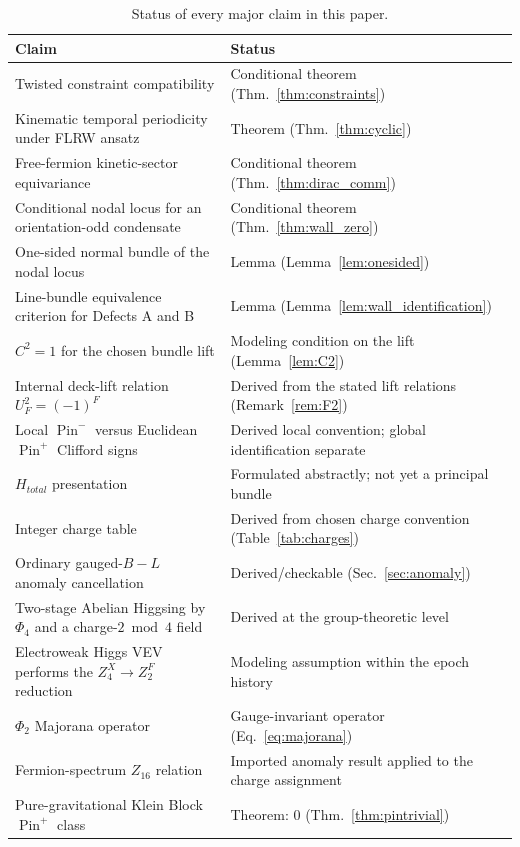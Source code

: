 \documentclass[11pt]{article}
\theoremstyle{canonmath}
\theoremstyle{canonpostulate}
\theoremstyle{canonclaim}
\providecommand{\Pin}{\operatorname{Pin}}
\def\mathrm#1{#1}%
\def\mathbb#1{#1}%
\begin{document}
\begin{table}[H]
\centering
\caption{Status of every major claim in this paper.}
\small
\begin{tabular}{@{}p{}p{}@{}}
\toprule
\textbf{Claim} & \textbf{Status} \\
\midrule
Twisted constraint compatibility & Conditional theorem (Thm.~\ref{thm:constraints}) \\
Kinematic temporal periodicity under FLRW ansatz & Theorem (Thm.~\ref{thm:cyclic}) \\
Free-fermion kinetic-sector equivariance & Conditional theorem (Thm.~\ref{thm:dirac_comm}) \\
Conditional nodal locus for an orientation-odd condensate & Conditional theorem (Thm.~\ref{thm:wall_zero}) \\
One-sided normal bundle of the nodal locus & Lemma (Lemma~\ref{lem:onesided}) \\
Line-bundle equivalence criterion for Defects A and B & Lemma (Lemma~\ref{lem:wall_identification}) \\
$C^2=1$ for the chosen bundle lift & Modeling condition on the lift (Lemma~\ref{lem:C2}) \\
Internal deck-lift relation $U_F^2=(-1)^F$ & Derived from the stated lift relations (Remark~\ref{rem:F2}) \\
Local $\Pin^-$ versus Euclidean $\Pin^+$ Clifford signs & Derived local convention; global identification separate \\
$H_{\mathrm{total}}$ presentation & Formulated abstractly; not yet a principal bundle \\
Integer charge table & Derived from chosen charge convention (Table~\ref{tab:charges}) \\
Ordinary gauged-$B-L$ anomaly cancellation & Derived/checkable (Sec.~\ref{sec:anomaly}) \\
Two-stage Abelian Higgsing by $\Phi_4$ and a charge-$2\bmod4$ field & Derived at the group-theoretic level \\
Electroweak Higgs VEV performs the $\mathbb Z_4^X\to\mathbb Z_2^F$ reduction & Modeling assumption within the epoch history \\
$\Phi_2$ Majorana operator & Gauge-invariant operator (Eq.~\ref{eq:majorana}) \\
Fermion-spectrum $\mathbb Z_{16}$ relation & Imported anomaly result applied to the charge assignment \\
Pure-gravitational Klein Block $\Pin^+$ class & Theorem: $0$ (Thm.~\ref{thm:pintrivial}) \\

\end{tabular}
\end{table}
\end{document}
